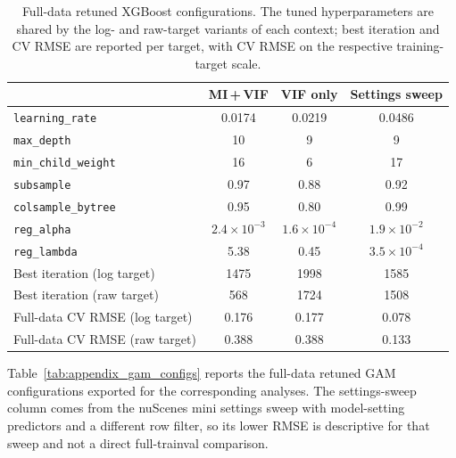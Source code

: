 \documentclass[12pt]{article}
\begin{document}
\begin{table}[H]
  \centering
  \caption[Full-data retuned XGBoost configurations]{Full-data retuned XGBoost configurations. The tuned hyperparameters are shared by the log- and raw-target variants of each context; best iteration and CV RMSE are reported per target, with CV RMSE on the respective training-target scale.}
  \label{tab:appendix_xgboost_configs}
  \footnotesize
  \renewcommand{\arraystretch}{1.08}
  \begin{tabular}{@{}lccc@{}}
    \toprule
    & \textbf{MI\,+\,VIF} & \textbf{VIF only} & \textbf{Settings sweep} \\
    \midrule
    \texttt{learning\_rate}     & 0.0174 & 0.0219 & 0.0486 \\
    \texttt{max\_depth}         & 10     & 9      & 9 \\
    \texttt{min\_child\_weight} & 16     & 6      & 17 \\
    \texttt{subsample}          & 0.97   & 0.88   & 0.92 \\
    \texttt{colsample\_bytree}  & 0.95   & 0.80   & 0.99 \\
    \texttt{reg\_alpha}         & $2.4\!\times\!10^{-3}$ & $1.6\!\times\!10^{-4}$ & $1.9\!\times\!10^{-2}$ \\
    \texttt{reg\_lambda}        & 5.38   & 0.45   & $3.5\!\times\!10^{-4}$ \\
    \midrule
    Best iteration (log target) & 1475   & 1998   & 1585 \\
    Best iteration (raw target) & 568    & 1724   & 1508 \\
    Full-data CV RMSE (log target) & 0.176 & 0.177 & 0.078 \\
    Full-data CV RMSE (raw target) & 0.388 & 0.388 & 0.133 \\
    \bottomrule
  \end{tabular}
\end{table}

Table~\ref{tab:appendix_gam_configs} reports the full-data retuned GAM configurations exported for the corresponding analyses. The settings-sweep column comes from the nuScenes mini settings sweep with model-setting predictors and a different row filter, so its lower RMSE is descriptive for that sweep and not a direct full-trainval comparison.
\end{document}
